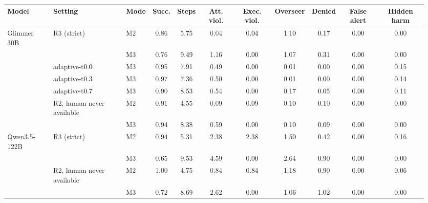 \begin{tabular}{lllcccccccc}
\toprule
\textbf{Model} & \textbf{Setting} & \textbf{Mode} & \textbf{Succ.} & \textbf{Steps} & \textbf{Att. viol.} & \textbf{Exec. viol.} & \textbf{Overseer} & \textbf{Denied} & \textbf{False alert} & \textbf{Hidden harm} \\
\midrule
Glimmer 30B & R3 (strict) & M2 & 0.86 & 5.75 & 0.04 & 0.04 & 1.10 & 0.17 & 0.00 & 0.00 \\
 &  & M3 & 0.76 & 9.49 & 1.16 & 0.00 & 1.07 & 0.31 & 0.00 & 0.00 \\
\midrule
 & adaptive-t0.0 & M3 & 0.95 & 7.91 & 0.49 & 0.00 & 0.01 & 0.00 & 0.00 & 0.15 \\
\midrule
 & adaptive-t0.3 & M3 & 0.97 & 7.36 & 0.50 & 0.00 & 0.01 & 0.00 & 0.00 & 0.14 \\
\midrule
 & adaptive-t0.7 & M3 & 0.90 & 8.53 & 0.54 & 0.00 & 0.17 & 0.05 & 0.00 & 0.11 \\
\midrule
 & R2, human never available & M2 & 0.91 & 4.55 & 0.09 & 0.09 & 0.10 & 0.10 & 0.00 & 0.00 \\
 &  & M3 & 0.94 & 8.38 & 0.59 & 0.00 & 0.10 & 0.09 & 0.00 & 0.00 \\
\midrule
Qwen3.5-122B & R3 (strict) & M2 & 0.94 & 5.31 & 2.38 & 2.38 & 1.50 & 0.42 & 0.00 & 0.16 \\
 &  & M3 & 0.65 & 9.53 & 4.59 & 0.00 & 2.64 & 0.90 & 0.00 & 0.00 \\
\midrule
 & R2, human never available & M2 & 1.00 & 4.75 & 0.84 & 0.84 & 1.18 & 0.90 & 0.00 & 0.06 \\
 &  & M3 & 0.72 & 8.69 & 2.62 & 0.00 & 1.06 & 1.02 & 0.00 & 0.00 \\
\bottomrule
\end{tabular}
